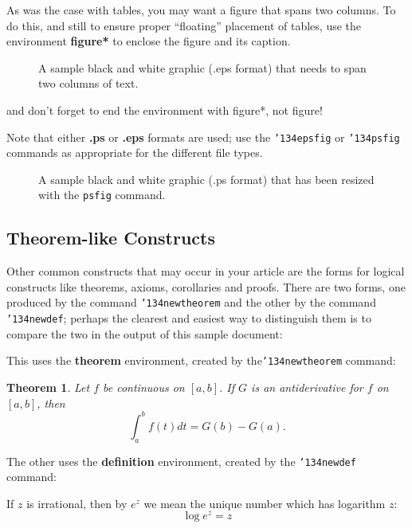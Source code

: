 \documentclass{sig-alternate-br}
\begin{document}
As was the case with tables, you may want a figure that spans two
columns.  To do this, and still to ensure proper ``floating''
placement of tables, use the environment \textbf{figure*} to
enclose the figure and its caption.
\begin{figure*}
\centering {} \caption{A sample black and
white graphic (.eps format) that needs to span two columns of
text.}
\end{figure*}
and don't forget to end the environment with {figure*}, not
{figure}!

Note that either {\textbf{.ps}} or {\textbf{.eps}} formats are
used; use the \texttt{{\char'134}epsfig} or
\texttt{{\char'134}psfig} commands as appropriate for the
different file types.

\begin{figure}
\caption{A sample black and white graphic (.ps format) that has
been resized with the \texttt{psfig} command.} \vskip -6pt
\end{figure}

\subsection{Theorem-like Constructs}
Other common constructs that may occur in your article are the
forms for logical constructs like theorems, axioms, corollaries
and proofs.  There are two forms, one produced by the command
\texttt{{\char'134}newtheorem} and the other by the command
\texttt{{\char'134}newdef}; perhaps the clearest and easiest way
to distinguish them is to compare the two in the output of this
sample document:

This uses the \textbf{theorem} environment, created by
the\linebreak\texttt{{\char'134}newtheorem} command:
\newtheorem{theorem}{Theorem}
\begin{theorem}
Let $f$ be continuous on $[a,b]$.  If $G$ is an antiderivative for
$f$ on $[a,b]$, then
\begin{displaymath}\int^b_af(t)dt = G(b) - G(a).\end{displaymath}
\end{theorem}

The other uses the \textbf{definition} environment, created by the
\texttt{{\char'134}newdef} command:
\begin{definition}
If $z$ is irrational, then by $e^z$ we mean the unique number
which has logarithm $z$: \begin{displaymath}{\log e^z =
z}\end{displaymath}
\end{definition}
\end{document}
